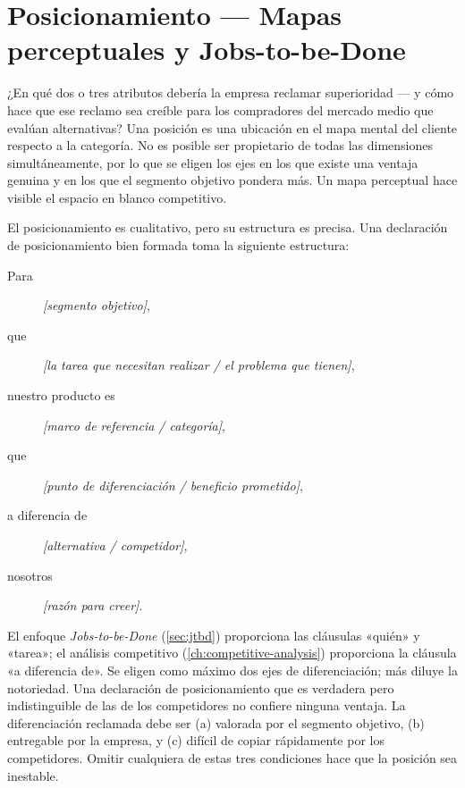 \section{Posicionamiento --- Mapas perceptuales y Jobs-to-be-Done}\label{sec:positioning}

¿En qué dos o tres atributos debería la empresa reclamar superioridad --- y cómo hace que ese reclamo sea creíble para los compradores del mercado medio que evalúan alternativas? Una posición es una ubicación en el mapa mental del cliente respecto a la categoría. No es posible ser propietario de todas las dimensiones simultáneamente, por lo que se eligen los ejes en los que existe una ventaja genuina y en los que el segmento objetivo pondera más. Un mapa perceptual hace visible el espacio en blanco competitivo.

El posicionamiento es cualitativo, pero su estructura es precisa. Una declaración de posicionamiento bien formada toma la siguiente estructura:

\begin{description}
  \item[Para] \textit{[segmento objetivo]},
  \item[que] \textit{[la tarea que necesitan realizar / el problema que tienen]},
  \item[nuestro producto es] \textit{[marco de referencia / categoría]},
  \item[que] \textit{[punto de diferenciación / beneficio prometido]},
  \item[a diferencia de] \textit{[alternativa / competidor]},
  \item[nosotros] \textit{[razón para creer]}.
\end{description}

El enfoque \emph{Jobs-to-be-Done} (\cref{sec:jtbd}) proporciona las cláusulas «quién» y «tarea»; el análisis competitivo (\cref{ch:competitive-analysis}) proporciona la cláusula «a diferencia de». Se eligen como máximo dos ejes de diferenciación; más diluye la notoriedad. Una declaración de posicionamiento que es verdadera pero indistinguible de las de los competidores no confiere ninguna ventaja. La diferenciación reclamada debe ser (a) valorada por el segmento objetivo, (b) entregable por la empresa, y (c) difícil de copiar rápidamente por los competidores. Omitir cualquiera de estas tres condiciones hace que la posición sea inestable.

